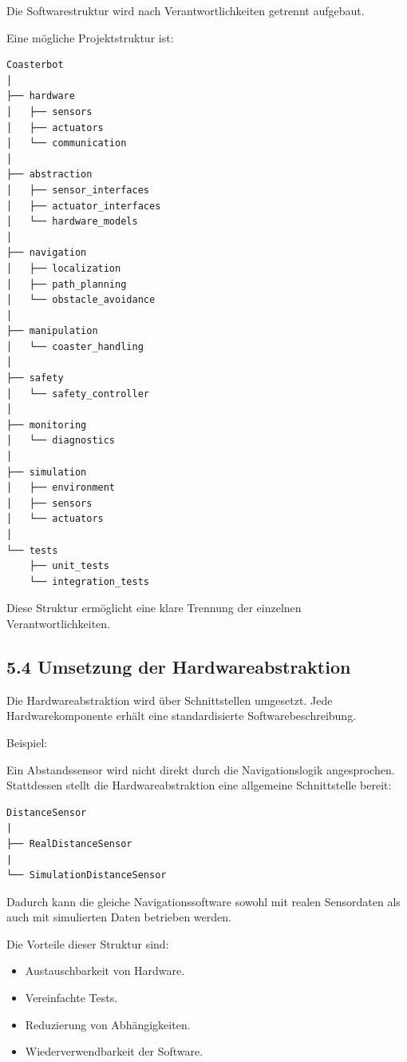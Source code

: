\documentclass[
  a4paper,
  12pt,
  DIV=12,        %
  parskip=half,  %
  headings=small %
]{scrartcl}
\theoremstyle{definition}
\providecommand{\tightlist}{%
  \setlength{\itemsep}{0pt}\setlength{\parskip}{0pt}}
\theoremstyle{definition}
\providecommand{\tightlist}{%
  \setlength{\itemsep}{0pt}\setlength{\parskip}{0pt}}
\begin{document}
Die Softwarestruktur wird nach Verantwortlichkeiten getrennt aufgebaut.

Eine mögliche Projektstruktur ist:

\begin{verbatim}
Coasterbot
│
├── hardware
│   ├── sensors
│   ├── actuators
│   └── communication
│
├── abstraction
│   ├── sensor_interfaces
│   ├── actuator_interfaces
│   └── hardware_models
│
├── navigation
│   ├── localization
│   ├── path_planning
│   └── obstacle_avoidance
│
├── manipulation
│   └── coaster_handling
│
├── safety
│   └── safety_controller
│
├── monitoring
│   └── diagnostics
│
├── simulation
│   ├── environment
│   ├── sensors
│   └── actuators
│
└── tests
    ├── unit_tests
    └── integration_tests
\end{verbatim}

Diese Struktur ermöglicht eine klare Trennung der einzelnen
Verantwortlichkeiten.

\subsection{5.4 Umsetzung der
Hardwareabstraktion}\label{umsetzung-der-hardwareabstraktion}

Die Hardwareabstraktion wird über Schnittstellen umgesetzt. Jede
Hardwarekomponente erhält eine standardisierte Softwarebeschreibung.

Beispiel:

Ein Abstandssensor wird nicht direkt durch die Navigationslogik
angesprochen. Stattdessen stellt die Hardwareabstraktion eine allgemeine
Schnittstelle bereit:

\begin{verbatim}
DistanceSensor
|
├── RealDistanceSensor
|
└── SimulationDistanceSensor
\end{verbatim}

Dadurch kann die gleiche Navigationssoftware sowohl mit realen
Sensordaten als auch mit simulierten Daten betrieben werden.

Die Vorteile dieser Struktur sind:

\begin{itemize}
\tightlist
\item
  Austauschbarkeit von Hardware.
\item
  Vereinfachte Tests.
\item
  Reduzierung von Abhängigkeiten.
\item
  Wiederverwendbarkeit der Software.
\end{itemize}
\end{document}
